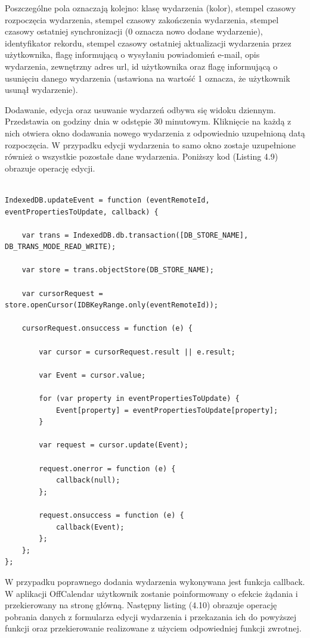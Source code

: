 Poszczególne pola oznaczają kolejno: klasę wydarzenia (kolor), stempel czasowy rozpoczęcia wydarzenia, stempel czasowy zakończenia wydarzenia, stempel czasowy ostatniej synchronizacji (0 oznacza nowo dodane wydarzenie), identyfikator rekordu, stempel czasowy ostatniej aktualizacji wydarzenia przez użytkownika, flagę informującą o wysyłaniu powiadomień \mbox{e-mail}, opis wydarzenia, zewnętrzny adres url, id użytkownika oraz flagę informującą o usunięciu danego wydarzenia (ustawiona na wartość 1 oznacza, że użytkownik usunął wydarzenie).

Dodawanie, edycja oraz usuwanie wydarzeń odbywa się widoku dziennym. Przedstawia on godziny dnia w odstępie 30 minutowym. Kliknięcie na każdą z nich otwiera okno dodawania nowego wydarzenia z odpowiednio uzupełnioną datą rozpoczęcia. W przypadku edycji wydarzenia to samo okno zostaje uzupełnione również o wszystkie pozostałe dane wydarzenia. Poniższy kod (Listing 4.9) obrazuje operację edycji.

\begin{lstlisting}[caption=Edycja wydarzenia cz. 1., label=amb, captionpos=b]

IndexedDB.updateEvent = function (eventRemoteId, eventPropertiesToUpdate, callback) {

    var trans = IndexedDB.db.transaction([DB_STORE_NAME], DB_TRANS_MODE_READ_WRITE);

    var store = trans.objectStore(DB_STORE_NAME);

    var cursorRequest = store.openCursor(IDBKeyRange.only(eventRemoteId));

    cursorRequest.onsuccess = function (e) {

        var cursor = cursorRequest.result || e.result;

        var Event = cursor.value;

        for (var property in eventPropertiesToUpdate) {
            Event[property] = eventPropertiesToUpdate[property];
        }

        var request = cursor.update(Event);

        request.onerror = function (e) {
            callback(null);
        };

        request.onsuccess = function (e) {
            callback(Event);
        };
    };
};

\end{lstlisting}

W przypadku poprawnego dodania wydarzenia wykonywana jest funkcja callback. W aplikacji \mbox{OffCalendar} użytkownik zostanie poinformowany o efekcie żądania i przekierowany na stronę główną. Następny listing (4.10) obrazuje operację pobrania danych z formularza edycji wydarzenia i przekazania ich do powyższej funkcji oraz przekierowanie realizowane z użyciem odpowiedniej funkcji zwrotnej.

